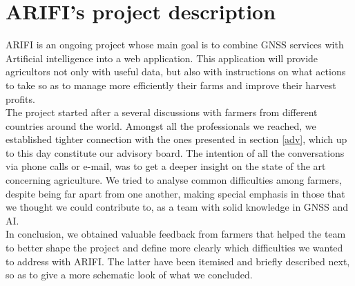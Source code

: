\section{ARIFI's project description}
ARIFI is an ongoing project whose main goal is to combine GNSS services with Artificial intelligence into a web application. This application will provide agricultors not only with useful data, but also with instructions on what actions to take so as to manage more efficiently their farms and improve their harvest profits.\\
%
%
The project started after a several discussions with farmers from different countries around the world. Amongst all the professionals we reached, we established tighter connection with the ones presented in section \ref{adv}, which up to this day constitute our advisory board. The intention of all the conversations via phone calls or e-mail, was to get a deeper insight on the state of the art concerning agriculture. We tried to analyse common difficulties among farmers, despite being far apart from one another, making special emphasis in those that we thought we could contribute to, as a team with solid knowledge in GNSS and AI.\\
%
%
In conclusion, we obtained valuable feedback from farmers that helped the team to better shape the project and define more clearly which difficulties we wanted to address with ARIFI. The latter have been itemised and briefly described next, so as to give a more schematic look of what we concluded.
